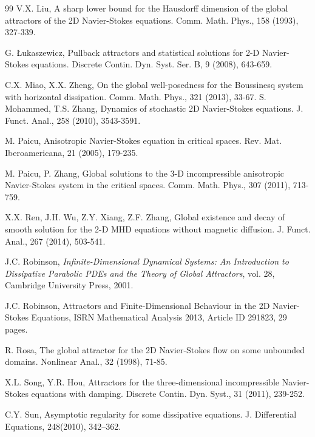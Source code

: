 \documentclass{elsarticle}
\theoremstyle{definition}
\numberwithin{equation}{section}
\begin{document}
\begin{thebibliography}{99}
 V.X. Liu,    A sharp lower bound for the Hausdorff dimension of the global attractors of the 2D Navier-Stokes equations. Comm. Math. Phys., 158 (1993), 327-339.





  G. {\L}ukaszewicz,    Pullback attractors and statistical solutions for 2-D Navier-Stokes equations. Discrete Contin. Dyn. Syst. Ser. B, 9 (2008), 643-659.

C.X. Miao, X.X. Zheng, On the global well-posedness for the Boussinesq system with horizontal dissipation. Comm. Math. Phys., 321 (2013), 33-67.
  S. Mohammed, T.S. Zhang,    Dynamics of stochastic 2D Navier-Stokes equations. J. Funct. Anal., 258 (2010), 3543-3591.



M. Paicu,   Anisotropic Navier-Stokes equation in critical spaces.  Rev. Mat. Iberoamericana, 21 (2005), 179-235.

M. Paicu, P. Zhang, Global solutions to the 3-D incompressible anisotropic Navier-Stokes system in the critical spaces. Comm. Math. Phys., 307 (2011),  713-759.

X.X. Ren, J.H. Wu, Z.Y. Xiang, Z.F. Zhang,  Global existence and decay of smooth solution for the 2-D MHD equations without magnetic diffusion. J. Funct. Anal., 267 (2014),  503-541.

 J.C. Robinson,   {\em Infinite-Dimensional Dynamical Systems: An Introduction to Dissipative Parabolic PDEs and the Theory of Global Attractors}, vol. 28, Cambridge University Press, 2001.

 J.C. Robinson,  Attractors and Finite-Dimensional Behaviour in the 2D Navier-Stokes Equations, ISRN Mathematical Analysis 2013, Article ID 291823, 29 pages.



 R.  Rosa,  The global attractor for the 2D Navier-Stokes flow on some unbounded domains.  Nonlinear Anal., 32 (1998), 71-85.







 X.L.  Song,  Y.R. Hou, Attractors for the three-dimensional incompressible Navier-Stokes equations with damping. Discrete Contin. Dyn. Syst., 31 (2011), 239-252.

 C.Y. Sun,  Asymptotic regularity for some dissipative equations. J. Differential Equations, 248(2010), 342–362.


\end{thebibliography}
\end{document}
